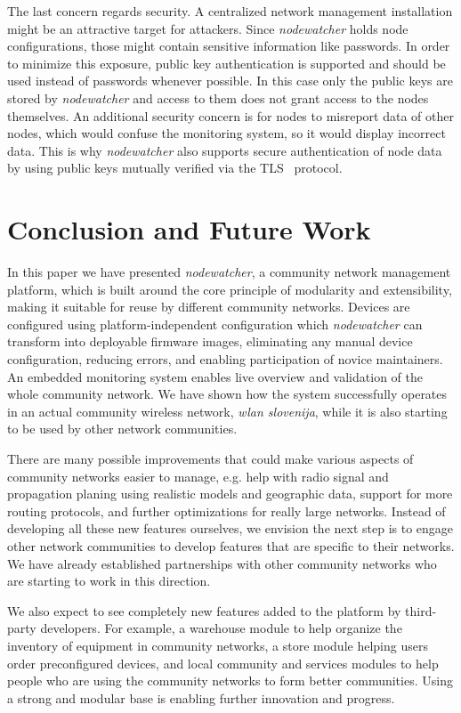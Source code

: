 \documentclass[5p,sort&compress]{elsarticle}
\newcommand{\nodewatcher}{\textit{nodewatcher}}
\newcommand{\wlanslovenija}{\textit{wlan slovenija}}
\begin{document}
The last concern regards security.
A centralized network management installation might be an attractive target for attackers.
Since \nodewatcher{} holds node configurations, those might contain sensitive information like passwords.
In order to minimize this exposure, public key authentication is supported and should be used instead of passwords whenever possible.
In this case only the public keys are stored by \nodewatcher{} and access to them does not grant access to the nodes themselves.
An additional security concern is for nodes to misreport data of other nodes, which would confuse the monitoring system, so it would display incorrect data.
This is why \nodewatcher{} also supports secure authentication of node data by using public keys mutually verified via the TLS~\cite{RFC_5246} protocol.

\section{Conclusion and Future Work}
\label{sec:conclusion}

In this paper we have presented \nodewatcher{}, a community network management platform, which is built around the core principle of modularity and extensibility, making it suitable for reuse by different community networks.
Devices are configured using platform-independent configuration which \nodewatcher{} can transform into deployable firmware images, eliminating any manual device configuration, reducing errors, and enabling participation of novice maintainers.
An embedded monitoring system enables live overview and validation of the whole community network.
We have shown how the system successfully operates in an actual community wireless network, \wlanslovenija{}, while it is also starting to be used by other network communities.

There are many possible improvements that could make various aspects of community networks easier to manage, e.g. help with radio signal and propagation planing using realistic models and geographic data, support for more routing protocols, and further optimizations for really large networks. Instead of developing all these new features ourselves, we envision the next step is to engage other network communities to develop features that are specific to their networks. We have already established partnerships with other community networks who are starting to work in this direction.

We also expect to see completely new features added to the platform by third-party developers.
For example, a warehouse module to help organize the inventory of equipment in community networks, a store module helping users order preconfigured devices, and local community and services modules to help people who are using the community networks to form better communities.
Using a strong and modular base is enabling further innovation and progress.
\end{document}
